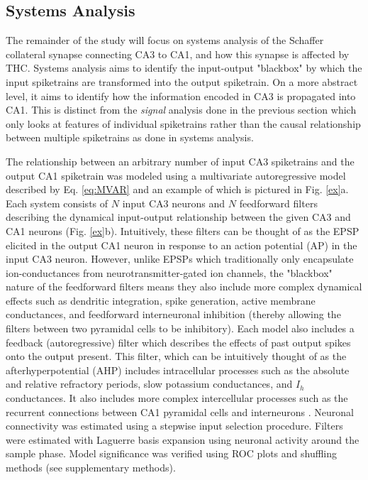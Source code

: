 \documentclass[11pt,a4paper,final]{article}
\begin{document}
    \subsection{Systems Analysis}

The remainder of the study will focus on systems analysis of the Schaffer collateral synapse  connecting CA3 to CA1, and how this synapse is affected by THC.
Systems analysis aims to identify the input-output "blackbox" by which the input spiketrains are transformed into the output spiketrain.
On a more abstract level, it aims to identify how the information encoded in CA3 is propagated into CA1.
This is distinct from the \textit{signal} analysis done in the previous section which only looks at features of individual spiketrains rather than the causal relationship between multiple spiketrains as done in systems analysis.

The relationship between an arbitrary number of input CA3 spiketrains and the output CA1 spiketrain was modeled using a multivariate autoregressive model described by Eq. \ref{eq:MVAR} and an example of which is pictured in Fig. \ref{ex}a.
Each system consists of $N$ input CA3 neurons and $N$ feedforward filters describing the dynamical input-output relationship between the given CA3 and CA1 neurons (Fig. \ref{ex}b). 
Intuitively, these filters can be thought of as the EPSP elicited in the output CA1 neuron in response to an action potential (AP) in the input CA3 neuron.
However, unlike EPSPs which traditionally only encapsulate ion-conductances from neurotransmitter-gated ion channels, the "blackbox" nature of the feedforward filters means they also include more complex dynamical effects such as dendritic integration, spike generation, active membrane conductances, and feedforward interneuronal inhibition (thereby allowing the filters between two pyramidal cells to be inhibitory).
Each model also includes a feedback (autoregressive) filter which describes the effects of past output spikes onto the output present.
This filter, which can be intuitively thought of as the afterhyperpotential (AHP) \citep{spruston07} includes intracellular processes such as the absolute and relative refractory periods, slow potassium conductances, and $I_h$ conductances.
It also includes more complex intercellular processes such as the recurrent connections between CA1 pyramidal cells and interneurons \citep{klausberger08}.
Neuronal connectivity was estimated using a stepwise input selection procedure.
Filters were estimated with Laguerre basis expansion using neuronal activity around the sample phase.
Model significance was verified using ROC plots and shuffling methods (see supplementary methods).
\end{document}
